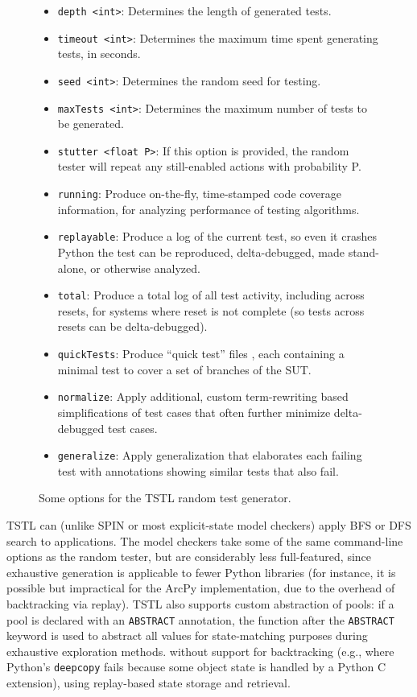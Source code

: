 \begin{figure}
{\scriptsize
\begin{itemize}
\item {\tt depth <int>}: Determines the length of generated tests.
\item {\tt timeout <int>}: Determines the maximum time spent generating tests, in seconds.
\item {\tt seed <int>}: Determines the random seed for testing.
\item {\tt maxTests <int>}: Determines the maximum number of tests to be generated.
\item {\tt stutter <float P>}: If this option is provided, the random tester will repeat any still-enabled actions with probability P.
\item {\tt running}: Produce on-the-fly, time-stamped code coverage information, for analyzing performance of testing algorithms. 
\item {\tt replayable}: Produce a log of the current test, so even it crashes Python the test can be reproduced, delta-debugged, made stand-alone, or otherwise analyzed.
\item {\tt total}: Produce a total log of all test activity, including across resets, for systems where reset is not complete (so tests across resets can be delta-debugged).
\item {\tt quickTests}:  Produce ``quick test'' files \cite{icst14}, each containing a minimal test to cover a set of branches of the SUT. 
\item {\tt normalize}: Apply additional, custom term-rewriting based simplifications of test cases that often further minimize delta-debugged test cases. 
\item {\tt generalize}: Apply generalization that elaborates each failing test with annotations showing similar tests that also fail. 
\end{itemize}
}
\caption{Some options for the TSTL random test generator.}
\label{tab:rt}
\end{figure}

TSTL can (unlike SPIN or most explicit-state model checkers) apply BFS or DFS search to applications.   The model checkers take some of the same command-line options as the random tester, but are considerably less full-featured, since exhaustive generation is applicable to fewer Python libraries (for instance, it is possible but impractical for the ArcPy implementation, due to the overhead of backtracking via replay).  TSTL also supports custom abstraction of pools:  if a pool is declared with an {\tt ABSTRACT} annotation, the function after the {\tt ABSTRACT} keyword is used to abstract all values for state-matching purposes during exhaustive exploration methods.  without support for backtracking (e.g., where Python's {\tt deepcopy} fails because some object state is handled by a Python C extension), using replay-based state storage and retrieval.

